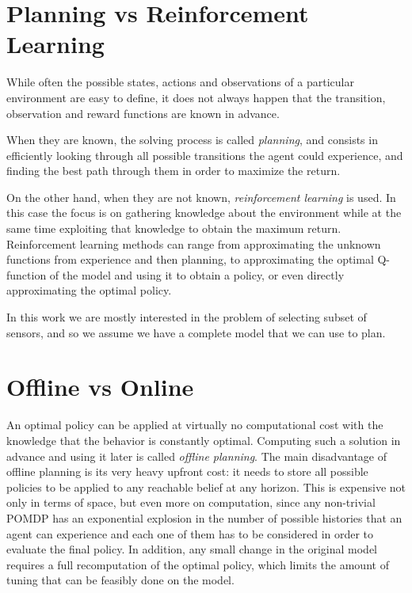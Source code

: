 \section{Planning vs Reinforcement Learning}\label{ref:solutions}

While often the possible states, actions and observations of a particular environment are easy to
define, it does not always happen that the transition, observation and reward functions are known in
advance.

When they are known, the solving process is called \textit{planning}, and consists in efficiently
looking through all possible transitions the agent could experience, and finding the best path
through them in order to maximize the return.

On the other hand, when they are not known, \textit{reinforcement learning} is used. In this case the
focus is on gathering knowledge about the environment while at the same time exploiting that
knowledge to obtain the maximum return. Reinforcement learning methods can range from approximating
the unknown functions from experience and then planning, to approximating the optimal Q-function of the
model and using it to obtain a policy, or even directly approximating the optimal policy.

In this work we are mostly interested in the problem of selecting subset of sensors, and so we
assume we have a complete model that we can use to plan.

\section{Offline vs Online}

An optimal policy can be applied at virtually no computational cost with the knowledge that the
behavior is constantly optimal. Computing such a solution in advance and using it later is called
\textit{offline planning}. The main disadvantage of offline planning is its very heavy upfront cost:
it needs to store all possible policies to be applied to any reachable belief at any horizon. This
is expensive not only in terms of space, but even more on computation, since any non-trivial POMDP
has an exponential explosion in the number of possible histories that an agent can experience and
each one of them has to be considered in order to evaluate the final policy. In addition, any small
change in the original model requires a full recomputation of the optimal policy, which limits the
amount of tuning that can be feasibly done on the model.

